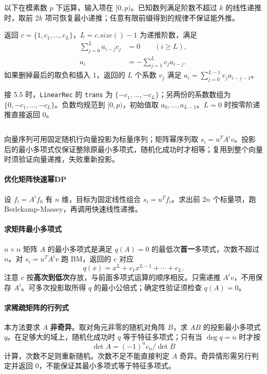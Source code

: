 以下在模素数 $p$ 下运算，输入项在 $[0,p)$。已知数列满足阶数不超过 $k$ 的线性递推时，取前 $2k$ 项可恢复最小递推；任意有限前缀得到的规律不保证能外推。

返回 $c=\{1,c_1,\ldots,c_L\}$，$L=c.size()-1$ 为递推阶数，满足
$$\begin{aligned}
\sum_{j=0}^{L}a_{i-j}c_j&=0\qquad(i\ge L),\\
a_i&=-\sum_{j=1}^{L}c_j a_{i-j}.
\end{aligned}$$
如果删掉最后的取负和插入 $1$，返回的 $L$ 个系数 $v_j$ 满足 $a_i=\sum_{j=0}^{L-1}v_j a_{i-j-1}$。

接 5.5 时，\texttt{LinearRec} 的 \texttt{trans} 为 $\{-c_1,\ldots,-c_L\}$；另两份的系数数组为 $\{0,-c_1,\ldots,-c_L\}$。负数均规范到 $[0,p)$，初始值取 $a_0,\ldots,a_{L-1}$。$L=0$ 时按零阶递推直接返回 $0$。

\inputminted{cpp}{sections/Polynomial/assets/Math/Berlekamp-Massey.cpp}

向量序列可用固定随机行向量投影为标量序列；矩阵幂序列取 $s_i=u^T A^i v$。投影后的最小多项式仅保证整除原最小多项式，随机化成功时才相等；复用到整个向量时须验证向量递推，失败重新投影。

\paragraph*{优化矩阵快速幂DP}

	设 $f_i=A^i f_0$ 有 $n$ 维，目标为固定线性组合 $s_i=u^T f_i$。求出前 $2n$ 个标量项，跑 Berlekamp-Massey，再调用快速线性递推。

\paragraph*{求矩阵最小多项式}

	$n\times n$ 矩阵 $A$ 的最小多项式是满足 $q(A)=0$ 的最低次\textbf{首一}多项式，次数不超过 $n$。对 $s_i=u^TA^iv$ 跑 BM，返回的 $c$ 对应
	$$q(x)=x^L+c_1x^{L-1}+\cdots+c_L.$$
	注意 $c$ 按\textbf{高次到低次}存放，与前面多项式运算的顺序相反。只需递推 $A^iv$，不用保存 $A^i$。可多次投影取所得 $q$ 的最小公倍式；确定性验证须检查 $q(A)=0$。

\paragraph*{求稀疏矩阵的行列式}

	本方法要求 $A$ \textbf{非奇异}。取对角元非零的随机对角阵 $B$，求 $AB$ 的投影最小多项式 $q$。在足够大的域上，随机化成功时 $q$ 等于特征多项式；只有当 $\deg q=n$ 时才按
	$$\det A=(-1)^n c_n/\det B$$
	计算，次数不足则重新随机。次数不足不能直接判定 $A$ 奇异。奇异情形需另行判定并返回 $0$，不能保证其最小多项式等于特征多项式。

